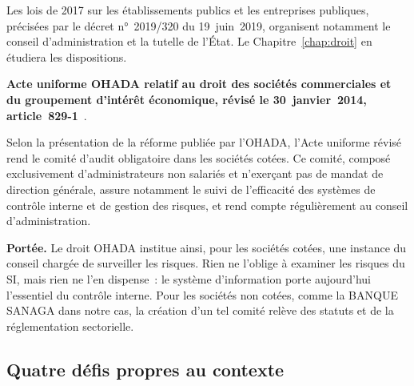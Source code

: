 Les lois de 2017 sur les établissements publics et les entreprises
publiques, précisées par le décret n°~2019/320 du 19~juin~2019, organisent
notamment le conseil d'administration et la tutelle de l'État. Le
Chapitre~\ref{chap:droit} en étudiera les dispositions.

\begin{boxjuris}
\textbf{Acte uniforme OHADA relatif au droit des sociétés commerciales et
du groupement d'intérêt économique, révisé le 30~janvier~2014,
article~829-1}~\cite{ohada2014auscgie}.

\medskip
Selon la présentation de la réforme publiée par l'OHADA, l'Acte uniforme
révisé rend le comité d'audit obligatoire dans les sociétés cotées. Ce
comité, composé exclusivement d'administrateurs non salariés et n'exerçant
pas de mandat de direction générale, assure notamment le suivi de
l'efficacité des systèmes de contrôle interne et de gestion des risques,
et rend compte régulièrement au conseil d'administration.

\medskip
\textbf{Portée.} Le droit OHADA institue ainsi, pour les sociétés cotées,
une instance du conseil chargée de surveiller les risques. Rien ne
l'oblige à examiner les risques du SI, mais rien ne l'en dispense~: le
système d'information porte aujourd'hui l'essentiel du contrôle interne.
Pour les sociétés non cotées, comme la BANQUE SANAGA dans notre cas, la
création d'un tel comité relève des statuts et de la réglementation
sectorielle.
\end{boxjuris}

\subsection{Quatre défis propres au contexte}

